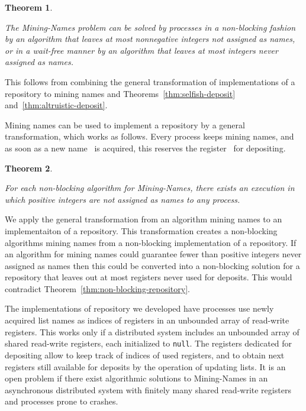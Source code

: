 \documentclass[11pt]{article}
\newcommand{\qed}{\hfill  \smallbreak}
\newenvironment{proof}{\noindent{\bf Proof:}}{\qed}
\newtheorem{theorem}{Theorem}
\begin{document}
\begin{theorem}
\label{thm:name-mining-solutions}

The Mining-Names problem can be solved by  processes in a non-blocking fashion by an algorithm that leaves at most  nonnegative integers not assigned as names, or in a wait-free manner by an algorithm that leaves at most  integers never assigned as names.
\end{theorem}

\begin{proof}
This follows from combining the general transformation of implementations of a repository to mining names and Theorems~\ref{thm:selfish-deposit} and~\ref{thm:altruistic-deposit}.
\end{proof}

Mining names can be used to implement a repository  by a general transformation, which works as follows.
Every process keeps mining names, and as soon as a new name~ is acquired, this reserves the register~ for depositing.



\begin{theorem}
\label{thm:name-mining-non-blocking-optimality}

For each non-blocking algorithm for Mining-Names, there exists an execution in which  positive integers are not assigned as names to any process.
\end{theorem}

\begin{proof}
We apply the general transformation from an algorithm mining names to an implementaiton of a repository.
This transformation creates a non-blocking algorithms mining names from a non-blocking implementation of a repository.
If an algorithm for mining names could guarantee fewer than  positive integers never assigned as names then this could be converted into a non-blocking solution for a repository that leaves out at most  registers never used for deposits.
This would contradict Theorem~\ref{thm:non-blocking-repository}.
\end{proof}

The implementations of repository we developed have processes use newly acquired list names as indices of registers in an unbounded array of read-write registers.
This works only if a distributed system includes an unbounded array of shared read-write registers, each initialized to \texttt{null}.
The registers dedicated for depositing allow to keep track of indices of used registers, and to obtain next registers still available for deposits by the operation of updating lists.
It is an open problem if there exist algorithmic solutions to Mining-Names in an asynchronous  distributed system with finitely many shared read-write registers and processes prone to crashes.







\end{document}
